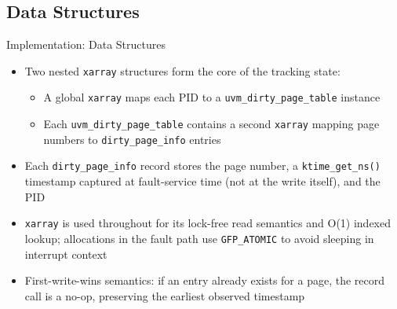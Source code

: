 \documentclass [xcolor=svgnames, t] {beamer}
\begin{document}
\subsection{Data Structures}
\begin{frame}{Implementation: Data Structures}
\begin{itemize}
    \item Two nested \texttt{xarray} structures form the core of the tracking state:
    \begin{itemize}
        \item A global \texttt{xarray} maps each PID to a \texttt{uvm\_dirty\_page\_table} instance
        \item Each \texttt{uvm\_dirty\_page\_table} contains a second \texttt{xarray} mapping page numbers to \texttt{dirty\_page\_info} entries
    \end{itemize}
    \item Each \texttt{dirty\_page\_info} record stores the page number, a \texttt{ktime\_get\_ns()} timestamp captured at fault-service time (not at the write itself), and the PID
    \item \texttt{xarray} is used throughout for its lock-free read semantics and O(1) indexed lookup; allocations in the fault path use \texttt{GFP\_ATOMIC} to avoid sleeping in interrupt context
    \item First-write-wins semantics: if an entry already exists for a page, the record call is a no-op, preserving the earliest observed timestamp
\end{itemize}
\end{frame}
\end{document}
